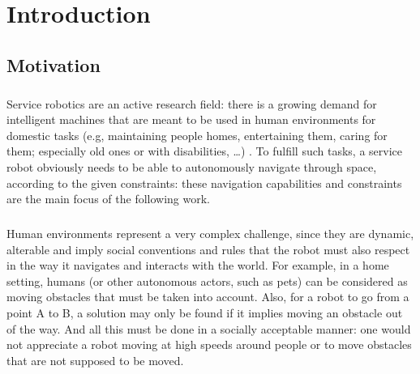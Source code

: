 
\chapter{Introduction} %

\label{Chapter1} %


\section{Motivation}

\paragraph{} Service robotics are an active research field: there is a growing demand for intelligent machines that are meant to be used in human environments for domestic tasks (e.g, maintaining people homes, entertaining them, caring for them; especially old ones or with disabilities, \dots) . To fulfill such tasks, a service robot obviously needs to be able to autonomously navigate through space, according to the given constraints: these navigation capabilities and constraints are the main focus of the following work.

\paragraph{} Human environments represent a very complex challenge, since they are dynamic, alterable and imply social conventions and rules that the robot must also respect in the way it navigates and interacts with the world. For example, in a home setting, humans (or other autonomous actors, such as pets) can be considered as moving obstacles that must be taken into account. Also, for a robot to go from a point A to B, a solution may only be found if it implies moving an obstacle out of the way. And all this must be done in a socially acceptable manner: one would not appreciate a robot moving at high speeds around people or to move obstacles that are not supposed to be moved.

